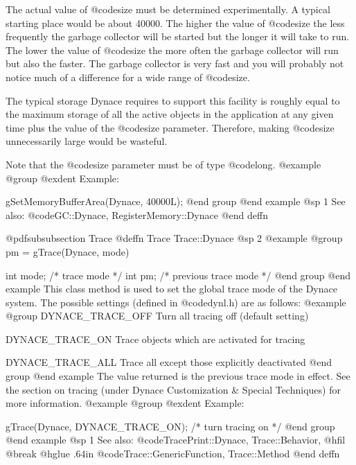 The actual value of @code{size} must be determined experimentally.
A typical starting place would be about 40000.  The higher the value of
@code{size} the less frequently the garbage collector will be started
but the longer it will take to run.  The lower the value of @code{size}
the more often the garbage collector will run but also the faster.
The garbage collector is very fast and you will probably not notice much
of a difference for a wide range of @code{size}.

The typical storage Dynace requires to support this facility is roughly
equal to the maximum storage of all the active objects in the
application at any given time plus the value of the @code{size}
parameter.  Therefore, making @code{size} unnecessarily large would
be wasteful.

Note that the @code{size} parameter must be of type @code{long}.
@example
@group
@exdent Example:

gSetMemoryBufferArea(Dynace, 40000L);
@end group
@end example
@sp 1
See also:  @code{GC::Dynace, RegisterMemory::Dynace}
@end deffn










@pdfsubsubsection {Trace}
@deffn {Trace} Trace::Dynace
@sp 2
@example
@group
pm = gTrace(Dynace, mode)

int     mode;   /*  trace mode           */
int     pm;     /*  previous trace mode  */
@end group
@end example
This class method is used to set the global trace mode of the Dynace system.
The possible settings (defined in @code{dynl.h}) are as follows:
@example
@group
DYNACE_TRACE_OFF       Turn all tracing off (default setting)

DYNACE_TRACE_ON        Trace objects which are activated for
                       tracing

DYNACE_TRACE_ALL       Trace all except those explicitly
                       deactivated
@end group
@end example
The value returned is the previous trace mode in effect.  See the
section on tracing (under Dynace Customization & Special Techniques) for
more information.
@example
@group
@exdent Example:

gTrace(Dynace, DYNACE_TRACE_ON);   /*  turn tracing on  */
@end group
@end example
@sp 1
See also:  @code{TracePrint::Dynace, Trace::Behavior,}
@hfil @break @hglue .64in @code{Trace::GenericFunction, Trace::Method}
@end deffn








